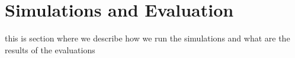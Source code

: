 \section{Simulations and Evaluation}
\label{sec:simulations-and-evaluations}
this is section where we describe how we run the simulations and what are the results of the evaluations